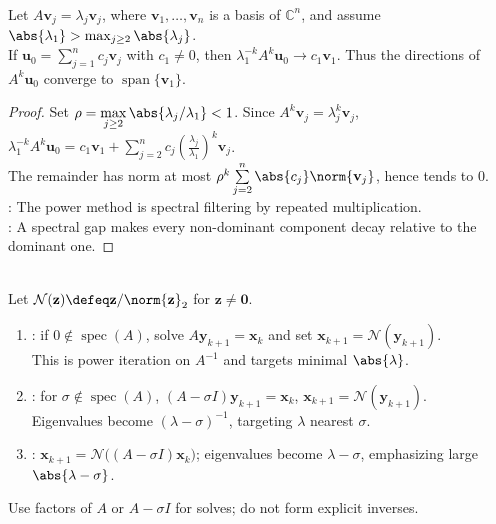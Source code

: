 \begin{theorem} \label{thm:power-method-dominant-eigenvector-preview} \\
Let $A\mathbf{v}_j=\lambda_j\mathbf{v}_j$, where $\mathbf{v}_1,\ldots,\mathbf{v}_n$ is a basis of $\mathbb{C}^n$, and assume $\abs{\lambda_1}>\max_{j\geq2}\abs{\lambda_j}$.\\
If $\mathbf{u}_0=\sum\limits_{j=1}^{n}c_j\mathbf{v}_j$ with $c_1\neq0$, then $\lambda_1^{-k}A^k\mathbf{u}_0\longrightarrow c_1\mathbf{v}_1$. Thus the directions of $A^k\mathbf{u}_0$ converge to $\operatorname{span}\{\mathbf{v}_1\}$.
\begin{proof}
Set $\rho=\max\limits_{j\geq2}\abs{\lambda_j/\lambda_1}<1$. Since $A^k\mathbf{v}_j=\lambda_j^k\mathbf{v}_j$, $\lambda_1^{-k}A^k\mathbf{u}_0 =c_1\mathbf{v}_1+\sum\limits_{j=2}^{n}c_j\left(\frac{\lambda_j}{\lambda_1}\right)^k\mathbf{v}_j$.\\
The remainder has norm at most $\rho^k\sum\limits_{j=2}^{n}\abs{c_j}\norm{\mathbf{v}_j}$, hence tends to $0$.\\
: The power method is spectral filtering by repeated multiplication.\\
: A spectral gap makes every non-dominant component decay relative to the dominant one.
\end{proof}
\end{theorem}

\begin{method} \label{meth:inverse-and-shifted-power-iteration-preview} \\
Let $\mathcal{N}(\mathbf{z})\defeq\mathbf{z}/\norm{\mathbf{z}}_2$ for $\mathbf{z}\neq\mathbf{0}$.
\begin{enumerate}[label=(\roman*)]
\setlength{\itemsep}{0pt}
\item {}: if $0\notin\operatorname{spec}(A)$, solve $A\mathbf{y}_{k+1}=\mathbf{x}_k$ and set $\mathbf{x}_{k+1}=\mathcal{N}(\mathbf{y}_{k+1})$.\\
This is power iteration on $A^{-1}$ and targets minimal $\abs{\lambda}$.
\item {}: for $\sigma\notin\operatorname{spec}(A)$, $(A-\sigma I)\mathbf{y}_{k+1}=\mathbf{x}_k$, $\mathbf{x}_{k+1}=\mathcal{N}(\mathbf{y}_{k+1})$.\\
Eigenvalues become $(\lambda-\sigma)^{-1}$, targeting $\lambda$ nearest $\sigma$.
\item {}: $\mathbf{x}_{k+1}=\mathcal{N}\bigl((A-\sigma I)\mathbf{x}_k\bigr)$; eigenvalues become $\lambda-\sigma$, emphasizing large $\abs{\lambda-\sigma}$.
\end{enumerate}
Use factors of $A$ or $A-\sigma I$ for solves; do not form explicit inverses.
\end{method}

